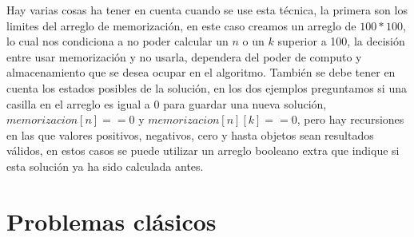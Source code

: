 Hay varias cosas ha tener en cuenta cuando se use esta técnica, la primera son los limites del arreglo de memorización, en este caso creamos un arreglo de $100*100$, lo cual nos condiciona a no poder calcular un $n$ o un $k$ superior a 100, la decisión entre usar memorización y no usarla, dependera del poder de computo y almacenamiento que se desea ocupar en el algoritmo. También se debe tener en cuenta los estados posibles de la solución, en los dos ejemplos preguntamos si una casilla en el arreglo es igual a 0 para guardar una nueva solución,$memorizacion[n] == 0$ y $memorizacion[n][k] == 0$, pero hay recursiones en las que valores positivos, negativos, cero y hasta objetos sean resultados válidos, en estos casos se puede utilizar un arreglo booleano extra que indique si esta solución ya ha sido calculada antes.
\section{Problemas clásicos}
